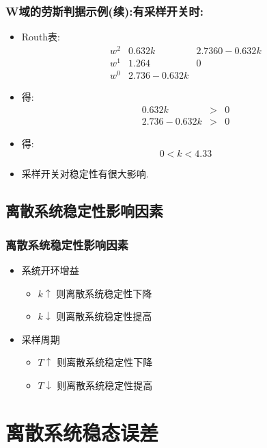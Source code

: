 \documentclass[table]{article}
\begin{document}
\begin{frame}
\frametitle{W域的劳斯判据示例(续):有采样开关时:}
\label{sec-5-2-4}

\begin{itemize}
\item Routh表:
      \[\begin{matrix}
      w^2 & 0.632k & 2.7360-0.632k \\
      w^1 & 1.264  & 0 \\
      w^0 & 2.736-0.632k
      \end{matrix}\]
\item 得:
      \begin{eqnarray*}
      0.632k &>  & 0\\
      2.736-0.632k& >& 0
      \end{eqnarray*}
\item 得:  
      \[0<k<4.33\]
\item <2->采样开关对稳定性有很大影响.
\end{itemize}
\end{frame}
\subsection{离散系统稳定性影响因素}
\label{sec-5-3}
\begin{frame}
\frametitle{离散系统稳定性影响因素}
\label{sec-5-3-1}

\begin{itemize}
\item <2->系统开环增益
\begin{itemize}
\item $k\uparrow$  则离散系统稳定性下降
\item $k\downarrow$  则离散系统稳定性提高
\end{itemize}
\item <3->采样周期
\begin{itemize}
\item $T\uparrow$  则离散系统稳定性下降
\item $T\downarrow$  则离散系统稳定性提高
\end{itemize}
\end{itemize}
\end{frame}
\section{离散系统稳态误差}
\label{sec-6}
\end{document}
